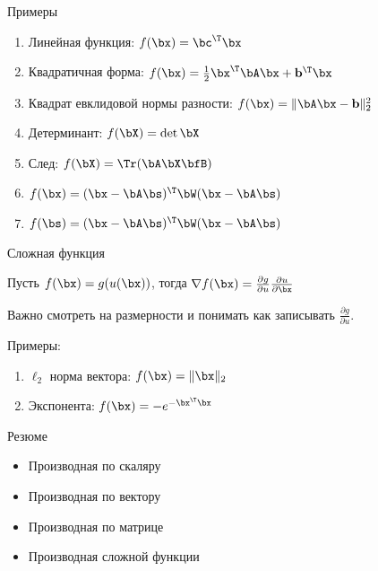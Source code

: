 \documentclass[12pt]{beamer}
\begin{document}
\begin{frame}{Примеры}
\begin{enumerate}
\item Линейная функция: $f(\bx) = \bc^{\T}\bx$
\item Квадратичная форма: $f(\bx) = \frac{1}{2}\bx^{\T}\bA\bx + \mathbf{b}^{\T}\bx$
\item Квадрат евклидовой нормы разности: $f(\bx) = \|\bA\bx - \mathbf{b}\|^2_2$
\item Детерминант: $f(\bX) = \det{\bX}$
\item След: $f(\bX) = \Tr(\bA\bX\bfB)$
\item $f(\bx) = (\bx - \bA\bs)^{\T}\bW(\bx - \bA\bs)$
\item $f(\bs) = (\bx - \bA\bs)^{\T}\bW(\bx - \bA\bs)$
\end{enumerate}
\end{frame}

\begin{frame}{Сложная функция}

Пусть $f(\bx) = g(u(\bx))$, тогда $\nabla f(\bx) = \frac{\partial g}{\partial u} \frac{\partial u}{\partial \bx}$

Важно смотреть на размерности и понимать как записывать $\frac{\partial g}{\partial u}$.

Примеры:
\begin{enumerate}
\item $\ell_2$ норма вектора: $f(\bx) = \|\bx\|_2$
\item Экспонента: $f(\bx) = - e^{-\bx^{\T}\bx}$
\end{enumerate}
\end{frame}

\begin{frame}{Резюме}
\begin{itemize}
\item Производная по скаляру
\item Производная по вектору
\item Производная по матрице
\item Производная сложной функции
\end{itemize}
\end{frame}
\end{document}
